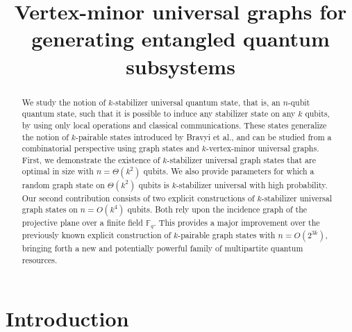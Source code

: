 \documentclass[10pt,a4paper]{article}
\title{Vertex-minor universal graphs for  generating  entangled quantum subsystems}
\begin{document}
\maketitle
\begin{abstract}
We study the notion of  $k$-stabilizer universal quantum state, that is, an $n$-qubit quantum state, such that it is possible to induce any stabilizer state on any $k$ qubits, by using only local operations and classical communications. These states generalize the notion of $k$-pairable states introduced by Bravyi et al., and can be studied from a combinatorial perspective using graph states and $k$-vertex-minor universal graphs. First, we demonstrate the existence of $k$-stabilizer universal graph states that are optimal in size with $n=\Theta(k^2)$ qubits. We also provide parameters for which a random graph state on $\Theta(k^2)$ qubits is $k$-stabilizer universal with high probability. Our second  contribution consists of two explicit constructions of $k$-stabilizer universal graph states on $n = O(k^4)$ qubits. Both  rely upon the incidence graph of the projective plane over a finite field $\mathbb{F}_q$. This provides a major improvement over the previously known explicit construction of $k$-pairable graph states with $n = O(2^{3k})$, 
bringing forth a new and potentially powerful family of multipartite quantum resources.
\end{abstract}

\section{Introduction}
\end{document}
